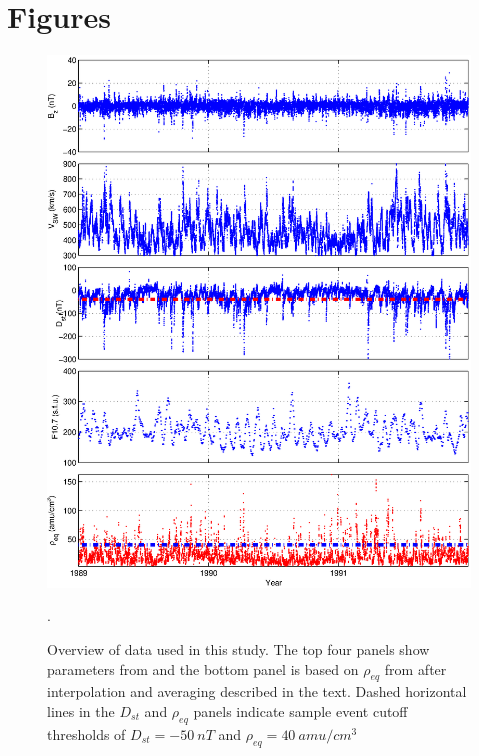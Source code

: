 \documentclass[10pt,twocolumn]{article}
\begin{document}
\newpage
\footnotesize




\clearpage
\section{Figures}

\begin{figure}[htp]
\centering
\includegraphics[scale=0.45]{paperfigures/alldata.eps}
\caption{Overview of data used in this study. The top four panels show parameters from \cite{Reconstruction} and the bottom panel is based on $\rho_{eq}$ from \cite{Denton} after interpolation and averaging described in the text. Dashed horizontal lines in the $D_{st}$ and $\rho_{eq}$ panels indicate sample event cutoff thresholds of $D_{st}=-50~nT$ and $\rho_{eq}=40~amu/cm^3$}.
\label{AllData}
\end{figure}
\end{document}
